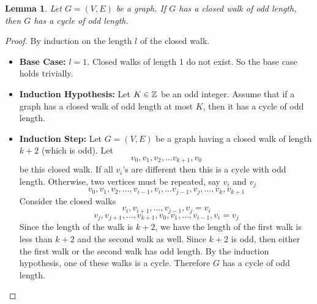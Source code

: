 \documentclass[openany]{report}
\newtheorem{lemma}{Lemma}[section]
\begin{document}
\begin{lemma}
    Let $G = (V,E)$ be a graph. If $G$ has a closed walk of odd length, then $G$ has a cycle of odd length.
\end{lemma}
\begin{proof}
    By induction on the length $l$ of the closed walk. 
    \begin{itemize}
        \item \textbf{Base Case:} $l = 1$. Closed walks of length 1 do not exist. So the base case holds trivially. 
        \item \textbf{Induction Hypothesis:} Let $K \in \mathbb{Z}$ be an odd integer. Assume that if a graph has a closed walk of odd length at most $K$, then it has a cycle of odd length.
        \item \textbf{Induction Step:} Let $G = (V,E)$ be a graph having a closed walk of length $k + 2$ (which is odd). Let 
        \[v_0, v_1, v_2, \ldots v_{k+1}, v_0\]
        be this closed walk. If all $v_i$'s are different then this is a cycle with odd length. Otherwise, two vertices must be repeated, say $v_i$ and $v_j$
        \[v_0, v_1, v_2, \ldots, v_{i-1}, v_{i},\ldots v_{j-1},v_{j}, \ldots, v_k, v_{k+1}\] 
        Consider the closed walks 
        \[v_i, v_{i+1}, \ldots, v_{j-1}, v_j = v_i\]
        \[v_j, v_{j+1}, \ldots, v_{k+1}, v_0, v_1, \ldots, v_{i-1}, v_i = v_j\]
        Since the length of the walk is $k+2$, we have the length of the first walk is less than $k+2$ and the second walk as well. Since $k+2$ is odd, then either the first walk or the second walk has odd length. By the induction hypothesis, one of these walks is a cycle. Therefore $G$ has a cycle of odd length. 
    \end{itemize}
\end{proof}
\end{document}
